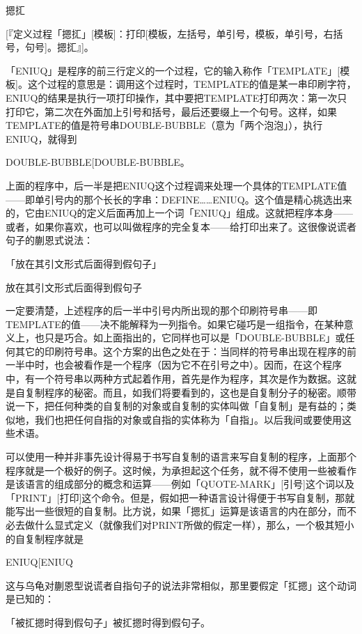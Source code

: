 \documentclass[
  12pt,
  twoside,
  openright,
  oldfontcommands,
]{memoir}
\begin{document}
摁㧟

{[}『定义过程「摁㧟」{[}模板{]}：打印{[}模板，左括号，单引号，模板，单引号，右括号，句号{]}。摁㧟』{]}。

「ENIUQ」是程序的前三行定义的一个过程，它的输入称作「TEMPLATE」{[}模板{]}。这个过程的意思是：调用这个过程时，TEMPLATE的值是某一串印刷字符，ENIUQ的结果是执行一项打印操作，其中要把TEMPLATE打印两次：第一次只打印它，第二次在外面加上引号和括号，最后还要缀上一个句号。这样，如果TEMPLATE的值是符号串DOUBLE-BUBBLE（意为「两个泡泡」），执行ENIUQ，就得到

DOUBLE-BUBBLE{[}\textquotesingle DOUBLE-BUBBLE\textquotesingle{]}。

上面的程序中，后一半是把ENIUQ这个过程调来处理一个具体的TEMPLATE值------即单引号内的那个长长的字串：DEFINE\ldots\ldots ENIUQ。这个值是精心挑选出来的，它由ENIUQ的定义后面再加上一个词「ENIUQ」组成。这就把程序本身------或者，如果你喜欢，也可以叫做程序的完全复本------给打印出来了。这很像说谎者句子的蒯恩式说法：

「放在其引文形式后面得到假句子」

放在其引文形式后面得到假句子

一定要清楚，上述程序的后一半中引号内所出现的那个印刷符号串------即TEMPLATE的值------决不能解释为一列指令。如果它碰巧是一组指令，在某种意义上，也只是巧合。如上面指出的，它同样也可以是「DOUBLE-BUBBLE」或任何其它的印刷符号串。这个方案的出色之处在于：当同样的符号串出现在程序的前一半中时，也会被看作是一个程序（因为它不在引号之中）。因而，在这个程序中，有一个符号串以两种方式起着作用，首先是作为程序，其次是作为数据。这就是自复制程序的秘密。而且，如我们将要看到的，这也是自复制分子的秘密。顺带说一下，把任何种类的自复制的对象或自复制的实体叫做「自复制」是有益的；类似地，我们也把任何自指的对象或自指的实体称为「自指」。以后我间或要使用这些术语。

可以使用一种并非事先设计得易于书写自复制的语言来写自复制的程序，上面那个程序就是一个极好的例子。这时候，为承担起这个任务，就不得不使用一些被看作是该语言的组成部分的概念和运算------例如「QUOTE-MARK」{[}引号{]}这个词以及「PRINT」{[}打印{]}这个命令。但是，假如把一种语言设计得便于书写自复制，那就能写出一些很短的自复制。比方说，如果「摁㧟」运算是该语言的内在部分，而不必去做什么显式定义（就像我们对PRINT所做的假定一样），那么，一个极其短小的自复制程序就是

ENIUQ{[}\textquotesingle ENIUQ\textquotesingle{]}

这与乌龟对蒯恩型说谎者自指句子的说法非常相似，那里要假定「㧟摁」这个动词是已知的：

「被㧟摁时得到假句子」被㧟摁时得到假句子。
\end{document}
